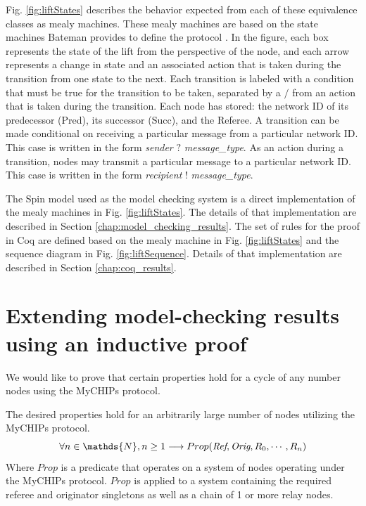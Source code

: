 \documentclass[runningheads]{llncs}
\begin{document}
Fig. \ref{fig:liftStates} describes the behavior expected from each of these equivalence classes as mealy machines.
These mealy machines are based on the state machines Bateman provides to define the protocol \cite{bateman_state_machines}.
In the figure, each box represents the state of the lift from the perspective of the node, and each arrow represents a change in state and an associated action that is taken during the transition from one state to the next. Each transition is labeled with a condition that must be true for the transition to be taken, separated by a $/$ from an action that is taken during the transition. Each node has stored: the network ID of its predecessor (Pred), its successor (Succ), and the Referee. A transition can be made conditional on receiving a particular message from a particular network ID. This case is written in the form \emph{sender} $?$ \emph{message\_type}. As an action during a transition, nodes may transmit a particular message to a particular network ID. This case is written in the form \emph{recipient} $!$ \emph{message\_type}. 

The Spin model used as the model checking system is a direct implementation of the mealy machines in Fig. \ref{fig:liftStates}. The details of that implementation are described in Section \ref{chap:model_checking_results}. The set of rules for the proof in Coq are defined based on the mealy machine in Fig. \ref{fig:liftStates} and the sequence diagram in 
 Fig. \ref{fig:liftSequence}. Details of that implementation are described in Section \ref{chap:coq_results}.
 
\section{Extending model-checking results using an inductive proof}
\label{sec:extending}

We would like to prove that certain properties hold for a cycle of any number nodes using the MyCHIPs protocol.

\begin{theorem}
The desired properties hold for an arbitrarily large number of nodes utilizing the MyCHIPs protocol.
$$
\forall n \in \mathds{N}, n \ge 1 \longrightarrow Prop(\emph{Ref}, \emph{Orig}, R_0, \dotsm, R_n)
$$
Where $Prop$ is a predicate that operates on a system of nodes operating under the MyCHIPs protocol. $Prop$ is applied to a system containing the required referee and originator singletons as well as a chain of 1 or more relay nodes.
\end{theorem}
\end{document}
